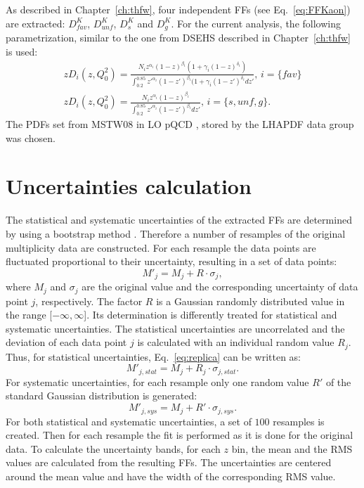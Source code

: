 As described in Chapter~\ref{ch:thfw}, four independent FFs (see Eq.~\ref{eq:FFKaon}) are extracted: $D^K_{fav}$, $D^K_{unf}$, $D^K_{s}$ and $D^K_{g}$.
For the current analysis, the following parametrization, similar to the one from DSEHS described in Chapter~\ref{ch:thfw} is used:
%
\begin{equation}
  \begin{split}
    zD_i(z,Q^2_0) = \frac{N_i z^{\alpha_i} (1-z)^{\beta_i} (1+\gamma_i(1-z)^{\delta_i})}{\int_{0.2}^{0.85} z'^{\alpha_i} (1-z')^{\beta_i} (1+\gamma_i(1-z')^{\delta_i} dz'},\,i=\{fav\} \\
    zD_i(z,Q^2_0) = \frac{N_i z^{\alpha_i} (1-z)^{\beta_i}}{\int_{0.2}^{0.85} z'^{\alpha_i} (1-z')^{\beta_i} dz'},\,i=\{s,unf,g\}.
  \end{split}
\end{equation}
%
The PDFs set from MSTW$08$ in LO pQCD \cite{MSTW08}, stored by the LHAPDF data group \cite{LHAPDF} was chosen.

\section{Uncertainties calculation}

The statistical and systematic uncertainties of the extracted FFs are determined by using a bootstrap method \cite{replicas}. Therefore a number of resamples of the original multiplicity data are constructed. For each resample the data points are fluctuated proportional to their uncertainty, resulting in a set of data points:
%
\begin{equation}\label{eq:replica}
  M'_j = M_j + R \cdot \sigma_j,
\end{equation}
%
where $M_j$ and $\sigma_j$ are the original value and the corresponding uncertainty of data point $j$, respectively. The factor $R$ is a Gaussian randomly distributed value in the range [$-\infty,\infty$]. Its determination is differently treated for statistical and systematic uncertainties.
The statistical uncertainties are uncorrelated and the deviation of each data point $j$ is calculated with an individual random value $R_j$. Thus, for statistical uncertainties, Eq.~\ref{eq:replica} can be written as:
%
\begin{equation}\label{eq:replica}
  M'_{j,stat} = M_j + R_j \cdot \sigma_{j,stat}.
\end{equation}
%
For systematic uncertainties, for each resample only one random value $R'$ of the standard Gaussian distribution is generated:
%
\begin{equation}\label{eq:replica}
  M'_{j,sys} = M_j + R' \cdot \sigma_{j,sys}.
\end{equation}
%
For both statistical and systematic uncertainties, a set of $100$ resamples is created. Then for each resample the fit is performed as it is done for the original data. To calculate the uncertainty bands, for each $z$ bin, the mean and the RMS values are calculated from the resulting FFs. The uncertainties are centered around the mean value and have the width of the corresponding RMS value.

